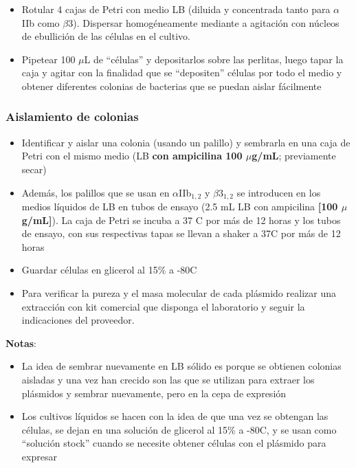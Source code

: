 \begin{appendix}
\begin{itemize}
\item{Rotular 4 cajas de Petri con medio LB (diluida y concentrada tanto para $\alpha$IIb como $\beta$3). Dispersar homogéneamente mediante a agitación con núcleos de ebullición de las células en el cultivo.} 

\item{Pipetear 100 $\mu$L de “células” y depositarlos sobre las perlitas, luego tapar la caja y agitar con la finalidad que se “depositen” células por todo el medio y obtener diferentes colonias de bacterias que se puedan aislar fácilmente}
\end{itemize}


\subsubsection{Aislamiento de colonias}
\begin{itemize}
\item{Identificar y aislar una colonia (usando un palillo) y sembrarla en una caja de Petri con el mismo medio (LB \textbf{con ampicilina 100 $\mu$g/mL}; previamente secar)}

\item{Además, los palillos que se usan en $\alpha$IIb$_{1,2}$ y $\beta$3$_{1,2}$ se introducen en los medios líquidos de LB en tubos de ensayo (2.5 mL LB con ampicilina \textbf{[100 $\mu$g/mL]}). La caja de Petri se incuba a 37 \textdegree C por más de 12 horas y los tubos de ensayo, con sus respectivas tapas se llevan a shaker a 37\textdegree C por más de 12 horas}

 \item{Guardar células en glicerol al 15\% a -80\textdegree C}
 
 \item{Para verificar la pureza y el masa molecular de cada plásmido realizar una extracción con kit comercial que disponga el laboratorio y seguir la indicaciones del proveedor.}

\end{itemize}

\textbf{Notas}:
\begin{itemize}
    \item{La idea de sembrar nuevamente en LB sólido es porque se obtienen colonias aisladas y una vez han crecido son las que se utilizan para extraer los plásmidos y sembrar nuevamente, pero en la cepa de expresión}
    
    \item{Los cultivos líquidos se hacen con la idea de que una vez se obtengan las células, se dejan en una solución de glicerol al 15\% a -80\textdegree C, y se usan como “solución stock” cuando se necesite obtener células con el plásmido para expresar}


\end{itemize}
\end{appendix}
